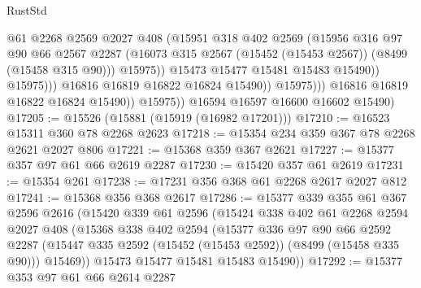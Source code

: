 \begin{lexlean}{RustStd}
\begin{coremodule}
                                  @61
                                  @2268
                                  @2569
                                  @2027
                                  @408
                                  (@15951
                                    @318
                                    @402
                                    @2569
                                    (@15956
                                      @316
                                      @97
                                      @90
                                      @66
                                      @2567
                                      @2287
                                      (@16073
                                        @315
                                        @2567
                                        (@15452 (@15453 @2567))
                                        (@8499 (@15458 @315 @90)))
                                      @15975))
                                  @15473
                                  @15477
                                  @15481
                                  @15483
                                  @15490))
                              @15975)))
                        @16816
                        @16819
                        @16822
                        @16824
                        @15490))
                    @15975)))
              @16816
              @16819
              @16822
              @16824
              @15490))
          @15975))
      @16594
      @16597
      @16600
      @16602
      @15490)
@17205 := @15526 (@15881 (@15919 (@16982 @17201)))
@17210 := @16523 @15311 @360 @78 @2268 @2623
@17218 := @15354 @234 @359 @367 @78 @2268 @2621 @2027 @806
@17221 := @15368 @359 @367 @2621
@17227 := @15377 @357 @97 @61 @66 @2619 @2287
@17230 := @15420 @357 @61 @2619
@17231 := @15354 @261
@17238 := @17231 @356 @368 @61 @2268 @2617 @2027 @812
@17241 := @15368 @356 @368 @2617
@17286 := @15377
    @339
    @355
    @61
    @367
    @2596
    @2616
    (@15420
      @339
      @61
      @2596
      (@15424
        @338
        @402
        @61
        @2268
        @2594
        @2027
        @408
        (@15368
          @338
          @402
          @2594
          (@15377
            @336
            @97
            @90
            @66
            @2592
            @2287
            (@15447 @335 @2592 (@15452 (@15453 @2592)) (@8499 (@15458 @335 @90)))
            @15469))
        @15473
        @15477
        @15481
        @15483
        @15490))
@17292 := @15377 @353 @97 @61 @66 @2614 @2287

\end{coremodule}
\end{lexlean}
